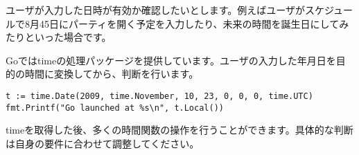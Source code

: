 ユーザが入力した日時が有効か確認したいとします。例えばユーザがスケジュールで8月45日にパーティを開く予定を入力したり、未来の時間を誕生日にしてみたりといった場合です。

Goではtimeの処理パッケージを提供しています。ユーザの入力した年月日を目的の時間に変換してから、判断を行います。

\begin{lstlisting}[numbers=none]
t := time.Date(2009, time.November, 10, 23, 0, 0, 0, time.UTC)
fmt.Printf("Go launched at %s\n", t.Local())
\end{lstlisting}


timeを取得した後、多くの時間関数の操作を行うことができます。具体的な判断は自身の要件に合わせて調整してください。

